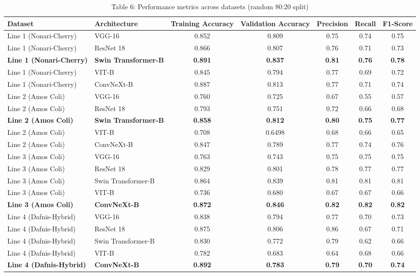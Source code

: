 \begin{table}[ht]
\centering
\caption{Table 6: Performance metrics across datasets (random 80:20 split)}
\begin{tabular}{llccccc}
\hline
Dataset & Architecture & Training Accuracy & Validation Accuracy & Precision & Recall & F1-Score \\
\hline
Line 1 (Nonari-Cherry) & VGG-16 & 0.852 & 0.809 & 0.75 & 0.74 & 0.75 \\
Line 1 (Nonari-Cherry) & ResNet 18 & 0.866 & 0.807 & 0.76 & 0.71 & 0.73 \\
\textbf{Line 1 (Nonari-Cherry)} & \textbf{Swin Transformer-B} & \textbf{0.891} & \textbf{0.837} & \textbf{0.81} & \textbf{0.76} & \textbf{0.78} \\
Line 1 (Nonari-Cherry) & VIT-B & 0.845 & 0.794 & 0.77 & 0.69 & 0.72 \\
Line 1 (Nonari-Cherry) & ConvNeXt-B & 0.887 & 0.813 & 0.77 & 0.71 & 0.74 \\
Line 2 (Amos Coli) & VGG-16 & 0.760 & 0.725 & 0.67 & 0.55 & 0.57 \\
Line 2 (Amos Coli) & ResNet 18 & 0.793 & 0.751 & 0.72 & 0.66 & 0.68 \\
\textbf{Line 2 (Amos Coli)} & \textbf{Swin Transformer-B} & \textbf{0.858} & \textbf{0.812} & \textbf{0.80} & \textbf{0.75} & \textbf{0.77} \\
Line 2 (Amos Coli) & VIT-B & 0.708 & 0.6498 & 0.68 & 0.66 & 0.65 \\
Line 2 (Amos Coli) & ConvNeXt-B & 0.847 & 0.789 & 0.77 & 0.74 & 0.76 \\
Line 3 (Amos Coli) & VGG-16 & 0.763 & 0.743 & 0.75 & 0.75 & 0.75 \\
Line 3 (Amos Coli) & ResNet 18 & 0.829 & 0.801 & 0.78 & 0.77 & 0.77 \\
Line 3 (Amos Coli) & Swin Transformer-B & 0.864 & 0.839 & 0.81 & 0.81 & 0.81 \\
Line 3 (Amos Coli) & VIT-B & 0.736 & 0.680 & 0.67 & 0.67 & 0.66 \\
\textbf{Line 3 (Amos Coli)} & \textbf{ConvNeXt-B} & \textbf{0.872} & \textbf{0.846} & \textbf{0.82} & \textbf{0.82} & \textbf{0.82} \\
Line 4 (Dafnis-Hybrid) & VGG-16 & 0.838 & 0.794 & 0.77 & 0.70 & 0.73 \\
Line 4 (Dafnis-Hybrid) & ResNet 18 & 0.875 & 0.806 & 0.86 & 0.67 & 0.71 \\
Line 4 (Dafnis-Hybrid) & Swin Transformer-B & 0.830 & 0.772 & 0.79 & 0.62 & 0.66 \\
Line 4 (Dafnis-Hybrid) & VIT-B & 0.782 & 0.683 & 0.64 & 0.68 & 0.66 \\
\textbf{Line 4 (Dafnis-Hybrid)} & \textbf{ConvNeXt-B} & \textbf{0.892} & \textbf{0.783} & \textbf{0.79} & \textbf{0.70} & \textbf{0.74} \\
\hline
\end{tabular}
\end{table}
